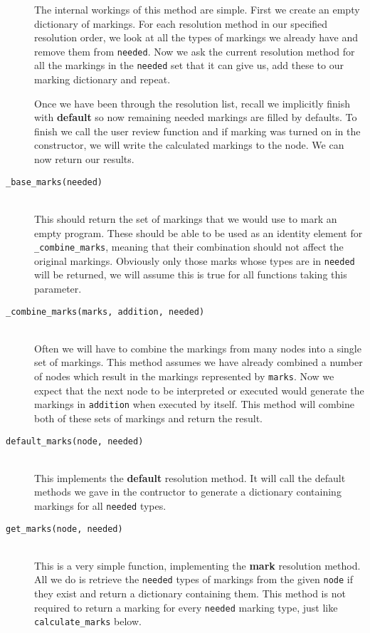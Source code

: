 \documentclass[twoside,a4paper]{report}
\begin{document}
\begin{description}
The internal workings of this method are simple. First we create an empty dictionary of markings. For each resolution method in our specified resolution
order, we look at all the types of markings we already have and remove them from \texttt{needed}. Now we ask the current resolution method for all the
markings in the \texttt{needed} set that it can give us, add these to our marking dictionary and repeat.

Once we have been through the resolution list, recall we implicitly finish with \textbf{default} so now remaining needed markings are filled by defaults.
To finish we call the user review function and if marking was turned on in the constructor, we will write the calculated markings to the node. We can now
return our results.

\item[\texttt{\_base\_marks(needed)}] \hfill \\
This should return the set of markings that we would use to mark an empty program. These should be able to be used as an identity element for
\texttt{\_combine\_marks}, meaning that their combination should not affect the original markings. Obviously only those marks whose types are in
\texttt{needed} will be returned, we will assume this is true for all functions taking this parameter.

\item[\texttt{\_combine\_marks(marks, addition, needed)}] \hfill \\
Often we will have to combine the markings from many nodes into a single set of markings. This method assumes we have already combined a number of nodes
which result in the markings represented by \texttt{marks}. Now we expect that the next node to be interpreted or executed would generate the markings
in \texttt{addition} when executed by itself. This method will combine both of these sets of markings and return the result.

\item[\texttt{default\_marks(node, needed)}] \hfill \\
This implements the \textbf{default} resolution method. It will call the default methods we gave in the contructor to generate a dictionary containing
markings for all \texttt{needed} types.

\item[\texttt{get\_marks(node, needed)}] \hfill \\
This is a very simple function, implementing the \textbf{mark} resolution method. All we do is retrieve the \texttt{needed} types of markings from the
given \texttt{node} if they exist and return a dictionary containing them. This method is not required to return a marking for every \texttt{needed}
marking type, just like \texttt{calculate\_marks} below.


\end{description}
\end{document}
